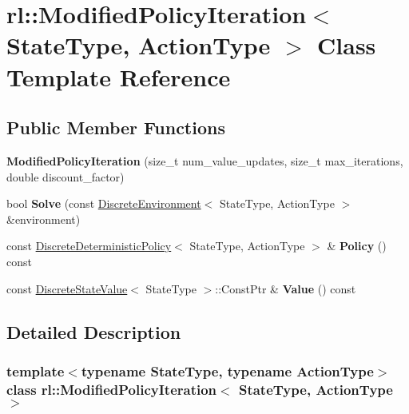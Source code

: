 \hypertarget{classrl_1_1_modified_policy_iteration}{}\section{rl\+:\+:Modified\+Policy\+Iteration$<$ State\+Type, Action\+Type $>$ Class Template Reference}
\label{classrl_1_1_modified_policy_iteration}
\subsection*{Public Member Functions}
\begin{DoxyCompactItemize}
\item 
\hypertarget{classrl_1_1_modified_policy_iteration_a541cc04f5cc477fe4229261b41eb5951}{}\label{classrl_1_1_modified_policy_iteration_a541cc04f5cc477fe4229261b41eb5951} 
{\bfseries Modified\+Policy\+Iteration} (size\+\_\+t num\+\_\+value\+\_\+updates, size\+\_\+t max\+\_\+iterations, double discount\+\_\+factor)
\item 
\hypertarget{classrl_1_1_modified_policy_iteration_ae9b2044a7baf7d0e4078b6910cc1720f}{}\label{classrl_1_1_modified_policy_iteration_ae9b2044a7baf7d0e4078b6910cc1720f} 
bool {\bfseries Solve} (const \hyperlink{classrl_1_1_discrete_environment}{Discrete\+Environment}$<$ State\+Type, Action\+Type $>$ \&environment)
\item 
\hypertarget{classrl_1_1_modified_policy_iteration_a9a52e336f2733e59581dd4cc586e137e}{}\label{classrl_1_1_modified_policy_iteration_a9a52e336f2733e59581dd4cc586e137e} 
const \hyperlink{classrl_1_1_discrete_deterministic_policy}{Discrete\+Deterministic\+Policy}$<$ State\+Type, Action\+Type $>$ \& {\bfseries Policy} () const
\item 
\hypertarget{classrl_1_1_modified_policy_iteration_a34fd1a8024a1a8f75bc2fbc6a7d3d6fb}{}\label{classrl_1_1_modified_policy_iteration_a34fd1a8024a1a8f75bc2fbc6a7d3d6fb} 
const \hyperlink{structrl_1_1_discrete_state_value}{Discrete\+State\+Value}$<$ State\+Type $>$\+::Const\+Ptr \& {\bfseries Value} () const
\end{DoxyCompactItemize}


\subsection{Detailed Description}
\subsubsection*{template$<$typename State\+Type, typename Action\+Type$>$\newline
class rl\+::\+Modified\+Policy\+Iteration$<$ State\+Type, Action\+Type $>$}



